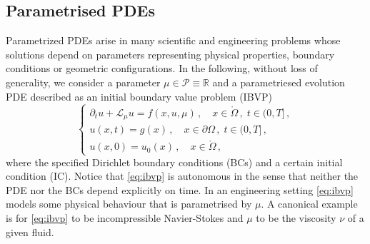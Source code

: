 \documentclass[../main.tex]{subfiles}
\begin{document}
\subsection{Parametrised PDEs}\label{subsec:par_pdes}

Parametrized PDEs arise in many scientific and engineering problems whose solutions depend on parameters representing physical properties, boundary conditions or geometric configurations. 
In the following, without loss of generality, we consider a parameter $\mu\in \mathcal{P}\equiv \mathbb{R}$ and a parametriesed evolution PDE described as an initial boundary value problem (IBVP)
\begin{equation}\label{eq:ibvp}
   \begin{cases}
           \partial_{t}u + \mathcal{L}_{\mu}u = f(x,u,\mu)\,, \quad x\in\mathring{\Omega}\,,\;t\in(0,T]\,,\\
       u(x,t) = g(x)\,,\quad x\in\partial\Omega\,,\;t\in(0,T]\,,\\ 
       u(x,0) = u_{0}(x)\,,\quad x \in\mathring{\Omega}\,,
   \end{cases}
\end{equation}
where the specified Dirichlet boundary conditions (BCs) and a certain initial condition (IC).
Notice that \eqref{eq:ibvp} is autonomous in the sense that neither the PDE nor the BCs depend explicitly on time.
In an engineering setting \eqref{eq:ibvp} models some physical behaviour that is parametrised by $\mu$.
A canonical example is for \eqref{eq:ibvp} to be incompressible Navier-Stokes and $\mu$ to be the viscosity $\nu$ of a given fluid.
\end{document}
